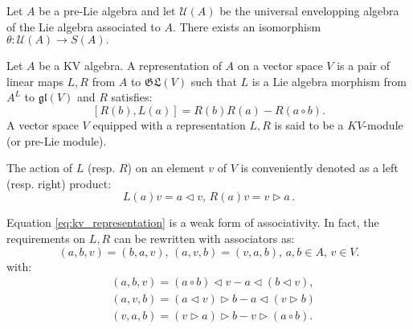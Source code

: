 \begin{thm}
    \label{thm:pbw_prelie}
    Let $A$ be a pre-Lie algebra and let $\mathcal{U}(A)$ be the universal envelopping algebra of the Lie algebra associated to $A$. There exists an isomorphism 
$\theta \colon \mathcal{U}(A) \to S(A).$
\end{thm}
\begin{defn}
Let $A$ be a KV algebra. A representation of $A$ on a vector space $V$ is a pair of linear maps $L,R$ from $A$ to $\mathfrak{GL}(V)$ such that $L$ is a Lie algebra morphism 
from $A^{L}$ to $\mathfrak{gl}(V)$ and $R$ satisfies:
\begin{equation}
    \label{eq:kv_representation}
    \left[R(b),L(a)\right]=R(b)R(a)-R(a \circ b).
\end{equation}
A vector space $V$ equipped with a representation $L,R$ is said to be a $KV$-module (or pre-Lie module). 
\end{defn}
\begin{notation}
The action of $L$ (resp. $R$) on an element $v$ of $V$ is conveniently denoted as a left (resp. right) product:
\[
L(a)v = a \triangleleft v, \, R(a)v = v \triangleright a \, .
\]
\end{notation}
\begin{rem}
    Equation \ref{eq:kv_representation} is a weak form of associativity. In fact, the requirements on $L,R$ can be rewritten with associators as:
    \begin{equation}
        \label{eq:module_associator}
        \left( a, b, v \right) = \left( b, a , v \right), \, \left( a, v, b \right) = \left( v, a,b \right), \, a,b \in A, \, v \in V.
    \end{equation}
with:
\begin{equation}
    \begin{split}
    &\left( a,b,v \right) = \left( a \circ b \right) \triangleleft v - a \triangleleft \left( b \triangleleft v\right), \\ 
    &\left( a, v, b \right) = \left( a \triangleleft v \right) \triangleright b - a \triangleleft \left( v \triangleright b \right) \\
    &\left( v, a, b \right) = \left( v \triangleright a \right) \triangleright b - v \triangleright \left( a \circ b \right).
    \end{split}
\end{equation}
\end{rem}
